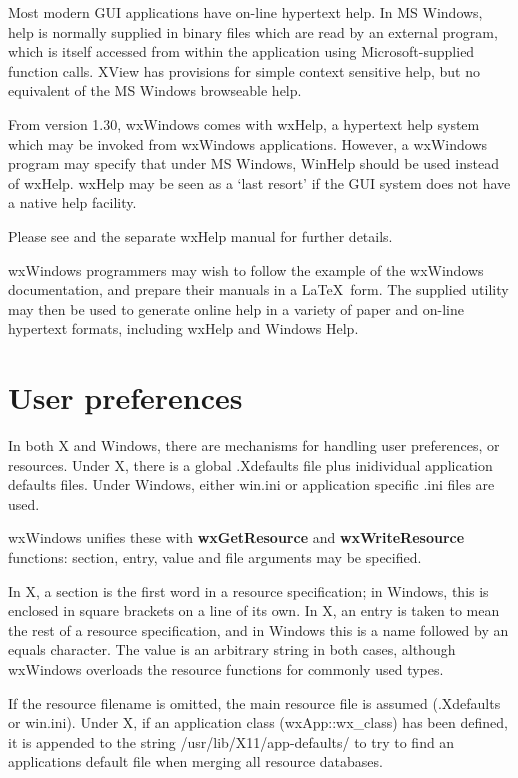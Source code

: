 Most modern GUI applications have on-line hypertext help. In MS Windows,
help is normally supplied in binary files which are read by an external
program, which is itself accessed from within the application using
Microsoft-supplied function calls. XView has provisions for simple
context sensitive help, but no equivalent of the MS Windows browseable
help.

From version 1.30, wxWindows comes with wxHelp, a hypertext help
system which may be invoked from wxWindows applications. However, a
wxWindows program may specify that under MS Windows, WinHelp should
be used instead of wxHelp. wxHelp may be seen as a `last resort' if the
GUI system does not have a native help facility.

Please see  and the separate wxHelp manual for
further details.

wxWindows programmers may wish to follow the example of the wxWindows
documentation, and prepare their manuals in a \LaTeX\ form. The supplied
\rtfsp{} utility may then be used to generate
online help in a variety of paper and on-line hypertext formats, including
wxHelp and Windows Help.

\section{User preferences}

In both X and Windows, there are mechanisms for handling user
preferences, or resources. Under X, there is a global .Xdefaults
file plus inidividual application defaults files. Under Windows,
either win.ini or application specific .ini files are used.

wxWindows unifies these with {\bf wxGetResource} and\rtfsp
{\bf wxWriteResource} functions: section, entry, value and
file arguments may be specified.

In X, a section is the first word in a resource specification; in
Windows, this is enclosed in square brackets on a line of its own.  In
X, an entry is taken to mean the rest of a resource specification, and
in Windows this is a name followed by an equals character.
The value is an arbitrary string in both cases, although wxWindows
overloads the resource functions for commonly used types.

If the resource filename is omitted, the main resource file is assumed
(.Xdefaults or win.ini). Under X, if an application class
(wxApp::wx\_class) has been defined, it is appended to the string
/usr/lib/X11/app-defaults/ to try to find an applications default
file when merging all resource databases.

